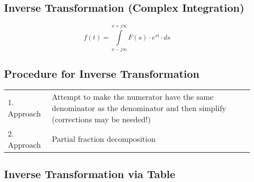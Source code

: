 		\subsection{Inverse Transformation (Complex Integration)}
			$$f(t)=\int\limits_{x-j\infty}^{x+j\infty}F(s) \cdot e^{st} \cdot ds$$


		\subsection{Procedure for Inverse Transformation}
		\begin{tabular}{ll}
  			1. Approach & Attempt to make the numerator have the same denominator as the denominator
  			and then simplify (corrections may be needed!) \\
  			2. Approach & Partial fraction decomposition
		\end{tabular}

		\newpage

		\subsection{Inverse Transformation via Table}
			\begin{center}
				
			\end{center}
			\vfill


